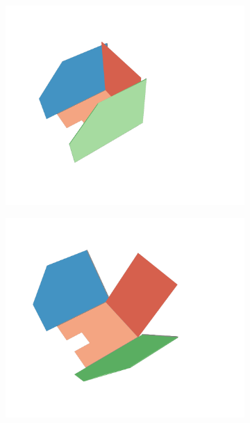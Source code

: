 \begin{figure}[h]
\captionsetup[subfigure]{justification=centering}
\vspace{-2ex}
	\centering
    \setlength{\subfigureWidth}{0.32\textwidth}
    \setlength{\graphicsHeight}{40mm}
    \hypersetup{hidelinks=true}%
	\begin{subfigure}[t]{\subfigureWidth}
        \centering
		\includegraphics[height=\graphicsHeight]{sections/design/solar-array/images/deployment/ismenius-cavus/solar_array_deployment_ismenius_cavus_000.png}
		\label{fig:sub:deployment-sequence-ismenius-cavus-stowed}
	\end{subfigure}\hfill
	\begin{subfigure}[t]{\subfigureWidth}
        \centering
		\includegraphics[height=\graphicsHeight]{sections/design/solar-array/images/deployment/ismenius-cavus/solar_array_deployment_ismenius_cavus_030.png}

\end{subfigure}
\end{figure}
